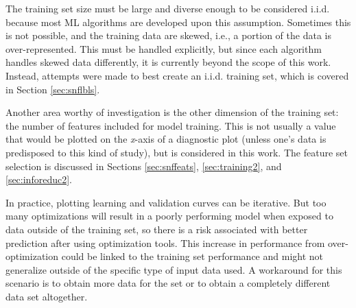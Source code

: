 The training set size must be large and diverse enough to be considered
\gls{i.i.d.} because most \gls{ML} algorithms are developed upon this
assumption. Sometimes this is not possible, and the training data are skewed,
i.e., a portion of the data is over-represented. This must be handled
explicitly, but since each algorithm handles skewed data differently, it is
currently beyond the scope of this work. Instead, attempts were made to best
create an \gls{i.i.d.} training set, which is covered in Section
\ref{sec:snflbls}.

Another area worthy of investigation is the other dimension of the training
set: the number of features included for model training. This is not usually a
value that would be plotted on the \textit{x}-axis of a diagnostic plot (unless
one's data is predisposed to this kind of study), but is considered in this
work. The feature set selection is discussed in Sections \ref{sec:snffeats},
\ref{sec:training2}, and \ref{sec:inforeduc2}.

In practice, plotting learning and validation curves can be iterative. But too
many optimizations will result in a poorly performing model when exposed to
data outside of the training set, so there is a risk associated with better
prediction after using optimization tools.  This increase in performance from
over-optimization could be linked to the training set performance and might not
generalize outside of the specific type of input data used.  A workaround for
this scenario is to obtain more data for the set or to obtain a completely
different data set altogether. 

